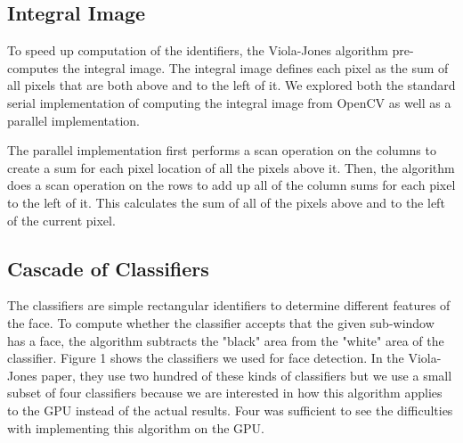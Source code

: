 \documentclass[12pt] {article}
\begin{document}
\subsection{Integral Image}
To speed up computation of the identifiers, the Viola-Jones algorithm pre-computes the integral image. The integral image defines each pixel as the sum of all pixels that are both above and to the left of it. We explored both the standard serial implementation of computing the integral image from OpenCV as well as a parallel implementation.

The parallel implementation first performs a scan operation on the columns to create a sum for each pixel location of all the pixels above it. Then, the algorithm does a scan operation on the rows to add up all of the column sums for each pixel to the left of it. This calculates the sum of all of the pixels above and to the left of the current pixel.


\subsection{Cascade of Classifiers}
The classifiers are simple rectangular identifiers to determine different features of the face. To compute whether the classifier accepts that the given sub-window has a face, the algorithm subtracts the "black" area from the "white" area of the classifier. Figure 1 shows the classifiers we used for face detection. In the Viola-Jones paper, they use two hundred of these kinds of classifiers but we use a small subset of four classifiers because we are interested in how this algorithm applies to the GPU instead of the actual results. Four was sufficient to see the difficulties with implementing this algorithm on the GPU.
\end{document}
